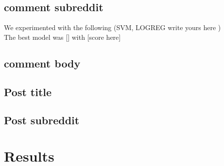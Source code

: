\documentclass{article}
\begin{document}
    \subsection{comment subreddit}
        We experimented with the following (SVM, LOGREG write yours here )\\
        The best model was [] with [score here]
    \subsection{comment body}
        
    \subsection{Post title}
    \subsection{Post subreddit}    
\section{Results}
\end{document}
